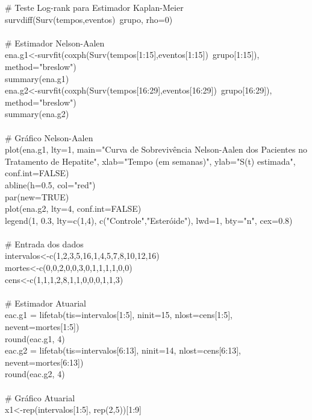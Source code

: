 \documentclass[12pt,a4paper]{article}
\begin{document}
	\# Teste Log-rank para Estimador Kaplan-Meier\\
	survdiff(Surv(tempos,eventos)~grupo, rho=0)\\
	\vspace{0.25cm}\\
	\# Estimador Nelson-Aalen\\
	ena.g1<-survfit(coxph(Surv(tempos[1:15],eventos[1:15])~grupo[1:15]), method="breslow")\\
	summary(ena.g1)\\
	ena.g2<-survfit(coxph(Surv(tempos[16:29],eventos[16:29])~grupo[16:29]), method="breslow")\\
	summary(ena.g2)\\
	\vspace{0.25cm}\\
	\# Gráfico Nelson-Aalen\\
	plot(ena.g1, lty=1, main="Curva de Sobrevivência Nelson-Aalen dos Pacientes no Tratamento de Hepatite", xlab="Tempo (em semanas)", ylab="S(t) estimada", conf.int=FALSE)\\
	abline(h=0.5, col="red")\\
	par(new=TRUE)\\
	plot(ena.g2, lty=4, conf.int=FALSE)\\
	legend(1, 0.3, lty=c(1,4), c("Controle","Esteróide"), lwd=1, bty="n", cex=0.8)\\
	\vspace{0.25cm}\\
	\# Entrada dos dados\\
	intervalos<-c(1,2,3,5,16,1,4,5,7,8,10,12,16)\\
	mortes<-c(0,0,2,0,0,3,0,1,1,1,1,0,0)\\
	cens<-c(1,1,1,2,8,1,1,0,0,0,1,1,3)\\
	\vspace{0.25cm}\\
	\# Estimador Atuarial\\
	eac.g1 = lifetab(tis=intervalos[1:5], ninit=15, nlost=cens[1:5], nevent=mortes[1:5])\\
	round(eac.g1, 4)\\
	eac.g2 = lifetab(tis=intervalos[6:13], ninit=14, nlost=cens[6:13], nevent=mortes[6:13])\\
	round(eac.g2, 4)\\
	\vspace{0.25cm}\\
	\# Gráfico Atuarial\\
	x1<-rep(intervalos[1:5], rep(2,5))[1:9]\\
\end{document}

